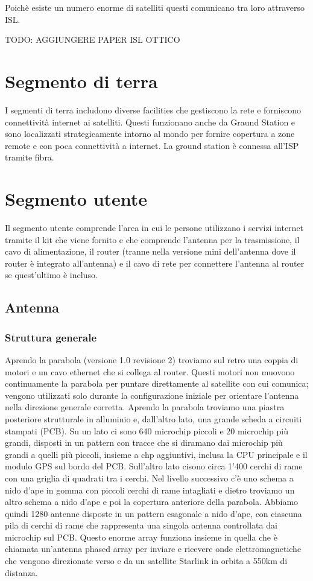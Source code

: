 Poichè esiste un numero enorme di satelliti questi comunicano tra loro attraverso \ac{ISL}.

TODO: AGGIUNGERE PAPER ISL OTTICO

\section{Segmento di terra}
I segmenti di terra includono diverse facilities che gestiscono la rete e forniscono connettività internet ai satelliti. Questi funzionano anche da Graund Station e sono localizzati strategicamente intorno al mondo per fornire copertura a zone remote e con poca connettività a internet.
La ground station è connessa all'\ac{ISP} tramite fibra.\cite{branch_education_how_2022}

\section{Segmento utente}
Il segmento utente comprende l'area in cui le persone utilizzano i servizi internet tramite il kit che viene fornito e che comprende l'antenna per la trasmissione, il cavo di alimentazione, il router (tranne nella versione mini dell'antenna dove il router è integrato all'antenna) e il cavo di rete per connettere l'antenna al router se quest'ultimo è incluso.\cite{branch_education_how_2022}

\subsection{Antenna}

\subsubsection{Struttura generale}
Aprendo la parabola (versione 1.0 revisione 2) troviamo sul retro una coppia di motori e un cavo ethernet che si collega al router.
Questi motori non muovono continuamente la parabola per puntare direttamente al satellite con cui comunica; vengono utilizzati solo durante la configurazione iniziale per orientare l'antenna nella direzione generale corretta.
Aprendo la parabola troviamo una piastra posteriore strutturale in alluminio e, dall'altro lato, una grande scheda a circuiti stampati (PCB).
Su un lato ci sono 640 microchip piccoli e 20 microchip più grandi, disposti in un pattern con tracce che si diramano dai microchip più grandi a quelli più piccoli, insieme a chp aggiuntivi, inclusa la CPU principale e il modulo GPS sul bordo del PCB. Sull'altro lato cisono circa 1'400 cerchi di rame con una griglia di quadrati tra i cerchi.
Nel livello successivo c'è uno schema a nido d'ape in gomma con piccoli cerchi di rame intagliati e dietro troviamo un altro schema a nido d'ape e poi la copertura anteriore della parabola.
Abbiamo quindi 1280 antenne disposte in un pattern esagonale a nido d'ape, con ciascuna pila di cerchi di rame che rappresenta una singola antenna controllata dai microchip sul PCB.
Questo enorme array funziona insieme in quella che è chiamata un'antenna phased array per inviare e ricevere onde elettromagnetiche che vengono direzionate verso e da un satellite Starlink in orbita a 550km di distanza.\cite{branch_education_how_2022}

